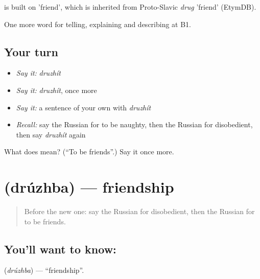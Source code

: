 \begin{cousinweb}
\emph{} is built on \emph{} 'friend', which is inherited from Proto-Slavic \emph{drug} 'friend' (EtymDB).
\end{cousinweb}

\begin{grammarlens}[title={What you've built}]
One more word for telling, explaining and describing at B1.
\end{grammarlens}

\subsection*{Your turn}
\begin{itemize}
\raggedright
  \item \emph{Say it:} \emph{druzhít}
  \item \emph{Say it:} \emph{druzhít}, once more
  \item \emph{Say it:} a sentence of your own with \emph{druzhít}
  \item \emph{Recall:} say the Russian for to be naughty, then the Russian for disobedient, then say \emph{druzhít} again
\end{itemize}

\begin{tcolorbox}[breakable,colback=teal!4,colframe=teal!35!black,title={Before you move on}]
What does  mean? (\textquotedblleft{}To be friends\textquotedblright{}.) Say it once more.
\end{tcolorbox}
\section[\texorpdfstring{\ru{дружба} (drúzhba)}{дружба (drúzhba)}]{ (drúzhba) — friendship}

\label{lesson:RU-C498-druzhba}



\begin{quote}
Before the new one: say the Russian for disobedient, then the Russian for to be friends.
\end{quote}

\subsection*{You'll want to know: }
\textbf{} (\emph{drúzhba}) — \textquotedblleft{}friendship\textquotedblright{}.

